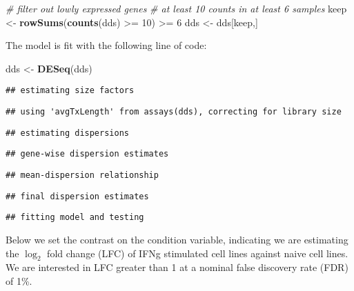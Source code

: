 \documentclass[
]{article}
\newenvironment{Shaded}{}{}
\newcommand{\CommentTok}[1]{\textcolor[rgb]{0.38,0.63,0.69}{\textit{#1}}}
\newcommand{\DecValTok}[1]{\textcolor[rgb]{0.25,0.63,0.44}{#1}}
\newcommand{\KeywordTok}[1]{\textcolor[rgb]{0.00,0.44,0.13}{\textbf{#1}}}
\newcommand{\NormalTok}[1]{#1}
\newcommand{\OperatorTok}[1]{\textcolor[rgb]{0.40,0.40,0.40}{#1}}
\newcommand{\StringTok}[1]{\textcolor[rgb]{0.25,0.44,0.63}{#1}}
\begin{document}
\begin{Shaded}
\begin{Highlighting}[]
\CommentTok{# filter out lowly expressed genes}
\CommentTok{# at least 10 counts in at least 6 samples}
\NormalTok{keep <-}\StringTok{ }\KeywordTok{rowSums}\NormalTok{(}\KeywordTok{counts}\NormalTok{(dds) }\OperatorTok{>=}\StringTok{ }\DecValTok{10}\NormalTok{) }\OperatorTok{>=}\StringTok{ }\DecValTok{6}
\NormalTok{dds <-}\StringTok{ }\NormalTok{dds[keep,]}
\end{Highlighting}
\end{Shaded}

The model is fit with the following line of code:

\begin{Shaded}
\begin{Highlighting}[]
\NormalTok{dds <-}\StringTok{ }\KeywordTok{DESeq}\NormalTok{(dds)}
\end{Highlighting}
\end{Shaded}

\begin{verbatim}
## estimating size factors
\end{verbatim}

\begin{verbatim}
## using 'avgTxLength' from assays(dds), correcting for library size
\end{verbatim}

\begin{verbatim}
## estimating dispersions
\end{verbatim}

\begin{verbatim}
## gene-wise dispersion estimates
\end{verbatim}

\begin{verbatim}
## mean-dispersion relationship
\end{verbatim}

\begin{verbatim}
## final dispersion estimates
\end{verbatim}

\begin{verbatim}
## fitting model and testing
\end{verbatim}

Below we set the contrast on the condition variable, indicating we are
estimating the \(\log_2\) fold change (LFC) of IFNg stimulated cell lines against
naive cell lines. We are interested in LFC greater than 1 at a nominal false
discovery rate (FDR) of 1\%.
\end{document}
